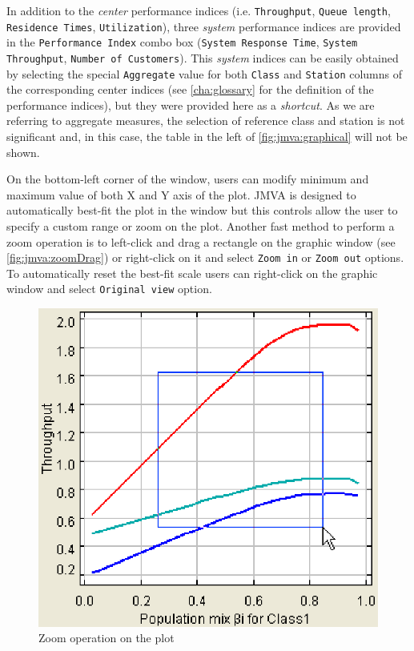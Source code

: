 In addition to the \emph{center} performance indices (i.e.
\texttt{Throughput}, \texttt{Queue length}, \texttt{Residence
Times}, \texttt{Utilization}), three \emph{system} performance
indices are provided  in the \texttt{Performance Index} combo box
(\texttt{System Response Time}, \texttt{System Throughput},
\texttt{Number of Customers}). This \emph{system} indices can be
easily obtained by selecting the special \texttt{Aggregate} value
for both \texttt{Class} and \texttt{Station} columns of the
corresponding center indices (see \autoref{cha:glossary} for the
definition of the performance indices), but they were provided here
as a \emph{shortcut}. As we are referring to aggregate measures, the
selection of reference class and station is not significant and, in
this case, the table in the left of \autoref{fig:jmva:graphical}
will not be shown.

On the bottom-left corner of the window, users can modify minimum
and maximum value of both X and Y axis of the plot. JMVA is designed
to automatically best-fit the plot in the window but this controls
allow the user to specify a custom range or zoom on the plot.
Another fast method to perform a zoom operation is to left-click and
drag a rectangle on the graphic window (see
\autoref{fig:jmva:zoomDrag}) or right-click on it and select
\texttt{Zoom in} or \texttt{Zoom out} options. To automatically
reset the best-fit scale users can right-click on the graphic window
and select \texttt{Original view} option.

\begin{figure}[htbp]
    \begin{center}
        \includegraphics[scale=.5]{img/jmva/whatIfDrag}
    \end{center}
    \caption{Zoom operation on the plot}
    \label{fig:jmva:zoomDrag}
\end{figure}

